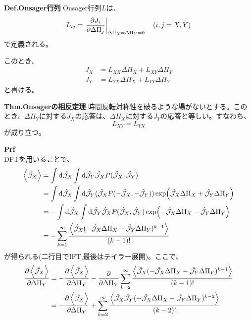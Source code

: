 \documentclass[a4paper,11pt]{jsarticle}
\begin{document}
\begin{itembox}[l]{\textbf{Def.Onsager行列}}
    Onsager行列$L$は、
    \begin{equation}
        L_{ij} = \left.\pdv{J_i}{\Delta \Pi_j}\right|_{\Delta \Pi_X=\Delta \Pi_Y=0} \quad (i,j = X,Y)
    \end{equation}
    で定義される。
\end{itembox}
このとき、
\begin{align}
    J_X &= L_{XX}\Delta\Pi_X + L_{XY}\Delta\Pi_Y\\
    J_Y &= L_{YX}\Delta\Pi_X + L_{YY}\Delta\Pi_Y
\end{align}
と書ける。\\
\begin{itembox}[l]{\textbf{Thm.Onsagerの相反定理}}
    時間反転対称性を破るような場がないとする。このとき、$\Delta \Pi_Y$に対する$J_X$の応答は、$\Delta \Pi_X$に対する$J_Y$の応答と等しい。すなわち、
    \begin{equation}
        L_{XY} = L_{YX}
    \end{equation}
    が成り立つ。
\end{itembox}
\textbf{Prf}\\
DFTを用いることで、
\begin{align}
    \ev{\hat{\mathcal{J}}_X} &= \int \dd \hat{\mathcal{J}}_X \int \dd \hat{\mathcal{J}}_Y \hat{\mathcal{J}}_X P(\hat{\mathcal{J}}_X, \hat{\mathcal{J}}_Y)\\
    &= \int \dd \hat{\mathcal{J}}_X \int \dd \hat{\mathcal{J}}_Y (\hat{\mathcal{J}}_X P(-\hat{\mathcal{J}}_X, -\hat{\mathcal{J}}_Y))\exp(\hat{\mathcal{J}}_X \Delta \Pi_X + \hat{\mathcal{J}}_Y \Delta \Pi_Y)\\
    &= -\int \dd \hat{\mathcal{J}}_X \int \dd \hat{\mathcal{J}}_Y \hat{\mathcal{J}}_X P(\hat{\mathcal{J}}_X, \hat{\mathcal{J}}_Y)\exp(-\hat{\mathcal{J}}_X \Delta \Pi_X - \hat{\mathcal{J}}_Y \Delta \Pi_Y)\\
    &= -\sum_{k=1}^{\infty} \frac{\ev{\hat{\mathcal{J}}_X(-\hat{\mathcal{J}}_X\Delta \Pi_X-\hat{\mathcal{J}}_Y\Delta \Pi_Y)^{k-1}}}{(k-1)!}
\end{align}
が得られる(二行目でIFT,最後はテイラー展開)。ここで、
\begin{align}
    \pdv{\ev{\hat{\mathcal{J}}_X}}{\Delta \Pi_Y} &= -\pdv{\ev{\hat{\mathcal{J}}_X}}{\Delta \Pi_Y} - \pdv{\Delta \Pi_Y}\sum_{k=2}^{\infty} \frac{\ev{\hat{\mathcal{J}}_X(-\hat{\mathcal{J}}_X\Delta \Pi_X-\hat{\mathcal{J}}_Y\Delta \Pi_Y)^{k-1}}}{(k-1)!}\\
    &= -\pdv{\ev{\hat{\mathcal{J}}_X}}{\Delta \Pi_Y} + \sum_{k=2}^{\infty} \frac{\ev{\hat{\mathcal{J}}_X \hat{\mathcal{J}}_Y(-\hat{\mathcal{J}}_X\Delta \Pi_X-\hat{\mathcal{J}}_Y\Delta \Pi_Y)^{k-2}}}{(k-2)!}
\end{align}
\end{document}
